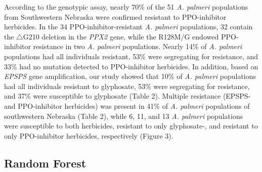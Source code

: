 \documentclass[
  12pt,
  a4paper]{article}
\begin{document}
According to the genotypic assay, nearly 70\% of the 51 \emph{A.
palmeri} populations from Southwestern Nebraska were confirmed resistant
to PPO-inhibitor herbicides. In the 34 PPO-inhibitor-resistant \emph{A.
palmeri} populations, 32 contain the \(\triangle\)G210 deletion in the
\emph{PPX2} gene, while the R128M/G endowed PPO-inhibitor resistance in
two \emph{A. palmeri} populations. Nearly 14\% of \emph{A. palmeri}
populations had all individuals resistant, 53\% were segregating for
resistance, and 33\% had no mutation detected to PPO-inhibitor
herbicides. In addition, based on \emph{EPSPS} gene amplification, our
study showed that 10\% of \emph{A. palmeri} populations had all
individuals resistant to glyphosate, 53\% were segregating for
resistance, and 37\% were susceptible to glyphosate (Table 2). Multiple
resistance (EPSPS- and PPO-inhibitor herbicides) was present in 41\% of
\emph{A. palmeri} populations of southwestern Nebraska (Table 2), while
6, 11, and 13 \emph{A. palmeri} populations were susceptible to both
herbicides, resistant to only glyphosate-, and resistant to only
PPO-inhibitor herbicides, respectively (Figure 3).

\hypertarget{random-forest-1}{%
\subsection{Random Forest}\label{random-forest-1}}
\end{document}
